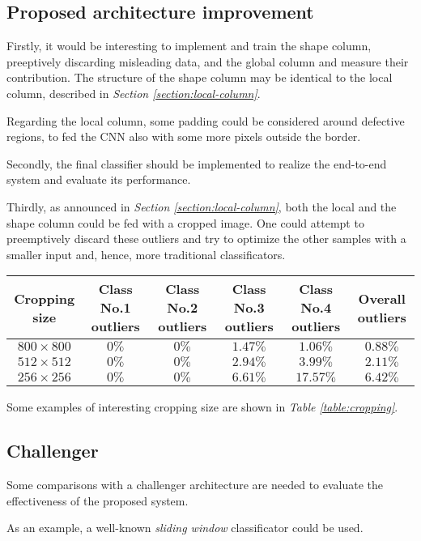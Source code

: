 \subsection{Proposed architecture improvement}
\par{
	Firstly, it would be interesting to implement and train the shape column, preeptively discarding misleading data, and the global column and measure their contribution. The structure of the shape column may be identical to the local column, described in \emph{Section \ref{section:local-column}}.
}
\par{
	Regarding the local column, some padding could be considered around defective regions, to fed the CNN also with some more pixels outside the border.
}
\par{
	Secondly, the final classifier should be implemented to realize the end-to-end system and evaluate its performance.
}
\par{
	Thirdly, as announced in \emph{Section \ref{section:local-column}}, both the local and the shape column could be fed with a cropped image. One could attempt to preemptively discard these outliers and try to optimize the other samples with a smaller input and, hence, more traditional classificators.
}
\begin{table*}
	\centering
	\normalsize
	\begin{tabular}{|c|c|c|c|c|c|}
		\hline
		\textbf{Cropping size} & \textbf{Class No.1 outliers} & \textbf{Class No.2 outliers}& \textbf{Class No.3 outliers} & \textbf{Class No.4 outliers} & \textbf{Overall outliers}\\\hline
		$800\times 800$ & $0\%$ & $0\%$ & $1.47\%$ & $1.06\%$ & $0.88\%$\\
		$512\times 512$ & $0\%$ & $0\%$ & $2.94\%$ & $3.99\%$ & $2.11\%$\\
		$256\times 256$ & $0\%$ & $0\%$ & $6.61\%$ & $17.57\%$& $6.42\%$\\
		\hline
	\end{tabular}
	\vspace{0.5cm}
	\caption{Cropping examples.}\label{table:cropping}
\end{table*}
\par{
	Some examples of interesting cropping size are shown in \emph{Table \ref{table:cropping}}.
}
\subsection{Challenger}
\par{
	Some comparisons with a challenger architecture are needed to evaluate the effectiveness of the proposed system.
}
\par{
	As an example, a well-known \emph{sliding window} classificator could be used.
}
